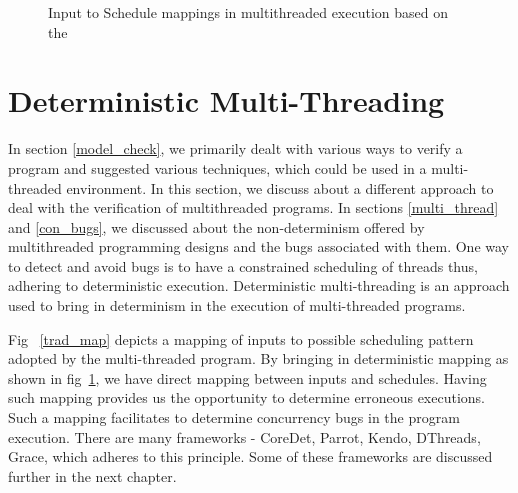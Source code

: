 \begin{figure}[h]
{\label{determinisitic_mapping}}
 \caption{Input to Schedule mappings in multithreaded execution based on the \citet{parrot}}
\end{figure}

\section{Deterministic Multi-Threading \label{sec_dmt}}

In section \ref{model_check}, we primarily dealt with various ways to verify a program and suggested various techniques, which could be used in a multi-threaded environment. 
In this section, we discuss about a different approach to deal with the verification of multithreaded programs. 
In sections \ref{multi_thread} and \ref{con_bugs}, we discussed about the non-determinism offered by multithreaded programming designs and the bugs associated with them. 
One way to detect and avoid bugs is to have a constrained scheduling of threads thus, adhering to deterministic execution. 
Deterministic multi-threading is an approach used to bring in determinism in the execution of multi-threaded programs. 



Fig~ \ref{trad_map} depicts a mapping of inputs to possible scheduling pattern adopted by the multi-threaded program. 
By bringing in deterministic mapping as shown in fig~\ref{determinisitic_mapping}, we have direct mapping between inputs and schedules. 
Having such mapping provides us the opportunity to determine erroneous executions. 
Such a mapping facilitates to determine concurrency bugs in the program execution. 
There are many frameworks - CoreDet\cite{coredet}, Parrot\cite{parrot}, Kendo\cite{kendo}, DThreads\cite{dthreads}, Grace\cite{grace}, which adheres to this principle. 
Some of these frameworks are discussed further in the next chapter.

